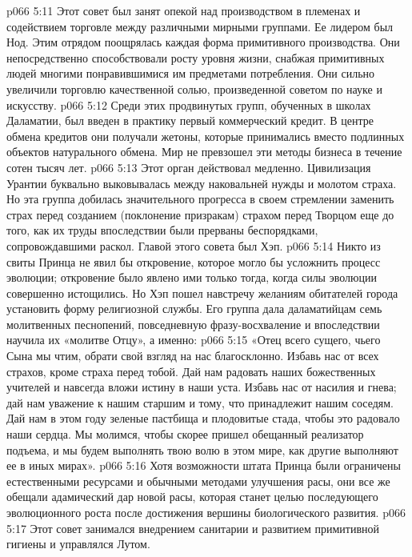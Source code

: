 \vs p066 5:11 \pc {}\bibnobreakspace {} Этот совет был занят опекой над производством в племенах и содействием торговле между различными мирными группами. Ее лидером был Нод. Этим отрядом поощрялась каждая форма примитивного производства. Они непосредственно способствовали росту уровня жизни, снабжая примитивных людей многими понравившимися им предметами потребления. Они сильно увеличили торговлю качественной солью, произведенной советом по науке и искусству.
\vs p066 5:12 Среди этих продвинутых групп, обученных в школах Даламатии, был введен в практику первый коммерческий кредит. В центре обмена кредитов они получали жетоны, которые принимались вместо подлинных объектов натурального обмена. Мир не превзошел эти методы бизнеса в течение сотен тысяч лет.
\vs p066 5:13 \pc {}\bibnobreakspace {} Этот орган действовал медленно. Цивилизация Урантии буквально выковывалась между наковальней нужды и молотом страха. Но эта группа добилась значительного прогресса в своем стремлении заменить страх перед созданием (поклонение призракам) страхом перед Творцом еще до того, как их труды впоследствии были прерваны беспорядками, сопровождавшими раскол. Главой этого совета был Хэп.
\vs p066 5:14 Никто из свиты Принца не явил бы откровение, которое могло бы усложнить процесс эволюции; откровение было явлено ими только тогда, когда силы эволюции совершенно истощились. Но Хэп пошел навстречу желаниям обитателей города установить форму религиозной службы. Его группа дала даламатийцам семь молитвенных песнопений, повседневную фразу\hyp{}восхваление и впоследствии научила их «молитве Отцу», а именно:
\vs p066 5:15 \pc «Отец всего сущего, чьего Сына мы чтим, обрати свой взгляд на нас благосклонно. Избавь нас от всех страхов, кроме страха перед тобой. Дай нам радовать наших божественных учителей и навсегда вложи истину в наши уста. Избавь нас от насилия и гнева; дай нам уважение к нашим старшим и тому, что принадлежит нашим соседям. Дай нам в этом году зеленые пастбища и плодовитые стада, чтобы это радовало наши сердца. Мы молимся, чтобы скорее пришел обещанный реализатор подъема, и мы будем выполнять твою волю в этом мире, как другие выполняют ее в иных мирах».
\vs p066 5:16 \pc Хотя возможности штата Принца были ограничены естественными ресурсами и обычными методами улучшения расы, они все же обещали адамический дар новой расы, которая станет целью последующего эволюционного роста после достижения вершины биологического развития.
\vs p066 5:17 \pc {}\bibnobreakspace {} Этот совет занимался внедрением санитарии и развитием примитивной гигиены и управлялся Лутом.
